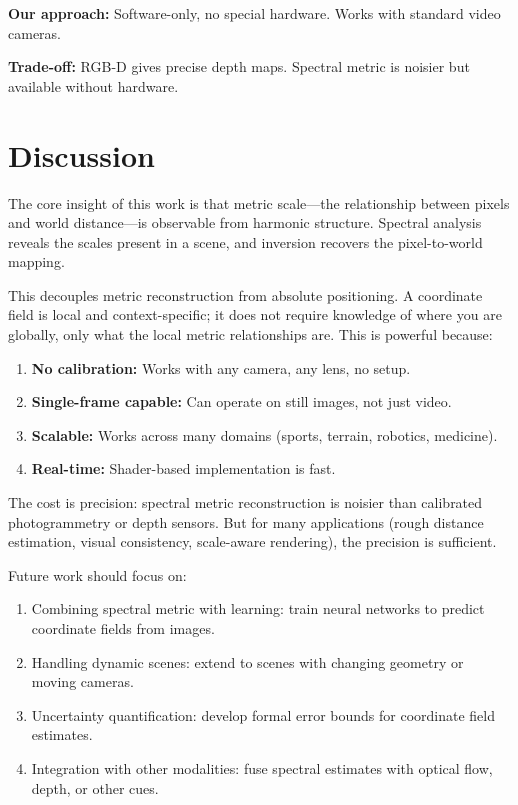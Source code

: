 \documentclass[11pt,twocolumn,a4paper]{article}
\theoremstyle{definition}
\begin{document}
\textbf{Our approach:} Software-only, no special hardware. Works with standard video cameras.

\textbf{Trade-off:} RGB-D gives precise depth maps. Spectral metric is noisier but available without hardware.

\section{Discussion}

The core insight of this work is that metric scale—the relationship between pixels and world distance—is observable from harmonic structure. Spectral analysis reveals the scales present in a scene, and inversion recovers the pixel-to-world mapping.

This decouples metric reconstruction from absolute positioning. A coordinate field is local and context-specific; it does not require knowledge of where you are globally, only what the local metric relationships are. This is powerful because:

\begin{enumerate}[leftmargin=1.4em]
  \item \textbf{No calibration:} Works with any camera, any lens, no setup.
  \item \textbf{Single-frame capable:} Can operate on still images, not just video.
  \item \textbf{Scalable:} Works across many domains (sports, terrain, robotics, medicine).
  \item \textbf{Real-time:} Shader-based implementation is fast.
\end{enumerate}

The cost is precision: spectral metric reconstruction is noisier than calibrated photogrammetry or depth sensors. But for many applications (rough distance estimation, visual consistency, scale-aware rendering), the precision is sufficient.

Future work should focus on:

\begin{enumerate}[leftmargin=1.4em]
  \item Combining spectral metric with learning: train neural networks to predict coordinate fields from images.
  \item Handling dynamic scenes: extend to scenes with changing geometry or moving cameras.
  \item Uncertainty quantification: develop formal error bounds for coordinate field estimates.
  \item Integration with other modalities: fuse spectral estimates with optical flow, depth, or other cues.
\end{enumerate}
\end{document}
